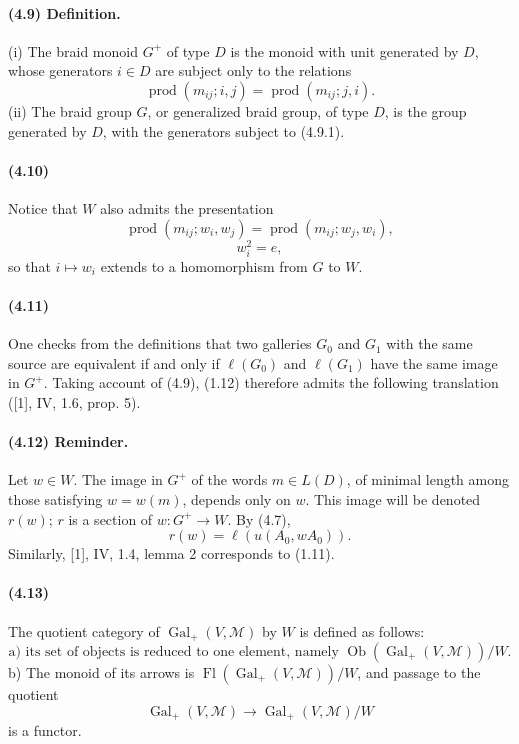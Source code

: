 \documentclass[10pt]{article}
\newcommand{\prodalt}{\operatorname{prod}}
\begin{document}
\paragraph{(4.9) Definition.} (i) The braid monoid \(G^+\) of type \(D\) is the monoid with unit generated by \(D\), whose generators \(i\in D\) are subject only to the relations
\[
\tag{4.9.1}
\prodalt(m_{ij};i,j)=\prodalt(m_{ij};j,i).
\]
(ii) The braid group \(G\), or generalized braid group, of type \(D\), is the group generated by \(D\), with the generators subject to (4.9.1).

\paragraph{(4.10)} Notice that \(W\) also admits the presentation
\[
\tag{4.10.1}
\prodalt(m_{ij};w_i,w_j)=\prodalt(m_{ij};w_j,w_i),
\]
\[
\tag{4.10.2}
w_i^2=e,
\]
so that \(i\mapsto w_i\) extends to a homomorphism from \(G\) to \(W\).

\paragraph{(4.11)} One checks from the definitions that two galleries \(G_0\) and \(G_1\) with the same source are equivalent if and only if \(\ell(G_0)\) and \(\ell(G_1)\) have the same image in \(G^+\). Taking account of (4.9), (1.12) therefore admits the following translation ([1], IV, 1.6, prop. 5).

\paragraph{(4.12) Reminder.} Let \(w\in W\). The image in \(G^+\) of the words \(m\in L(D)\), of minimal length among those satisfying \(w=w(m)\), depends only on \(w\). This image will be denoted \(r(w)\); \(r\) is a section of \(w:G^+\to W\). By (4.7),
\[
r(w)=\ell(u(A_0,wA_0)).
\]
Similarly, [1], IV, 1.4, lemma 2 corresponds to (1.11).

\paragraph{(4.13)} The quotient category of \(\operatorname{Gal}_+(V,\mathcal M)\) by \(W\) is defined as follows:
\[
\text{a) its set of objects is reduced to one element, namely }
\operatorname{Ob}(\operatorname{Gal}_+(V,\mathcal M))/W.
\]
b) The monoid of its arrows is \(\operatorname{Fl}(\operatorname{Gal}_+(V,\mathcal M))/W\), and passage to the quotient
\[
\operatorname{Gal}_+(V,\mathcal M)\longrightarrow
\operatorname{Gal}_+(V,\mathcal M)/W
\]
is a functor.
\end{document}

